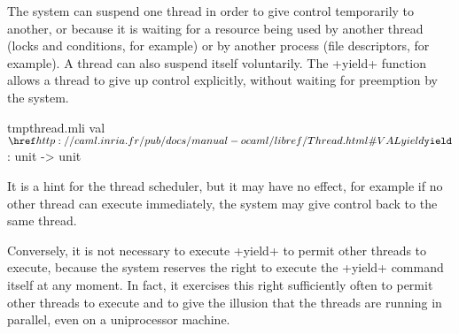 The system can suspend one thread in order to give control temporarily
to another, or because it is waiting for a resource being used by
another thread (locks and conditions, for example) or by another
process (file descriptors, for example).  A thread can also suspend
itself voluntarily.  The \ml+yield+ function allows a thread to give
up control explicitly, without waiting for preemption by the system.
%
\begin{listingcodefile}{tmpthread.mli}
val $\indexlibvalue{Thread}{yield}$ : unit -> unit
\end{listingcodefile}
%
It is a hint for the thread scheduler, but it may have no effect, for
example if no other thread can execute immediately, the system may
give control back to the same thread.

Conversely, it is not necessary to execute \ml+yield+ to permit other
threads to execute, because the system reserves the right to execute
the \ml+yield+ command itself at any moment.  In fact, it exercises
this right sufficiently often to permit other threads to execute and
to give the illusion that the threads are running in parallel, even on
a uniprocessor machine.


